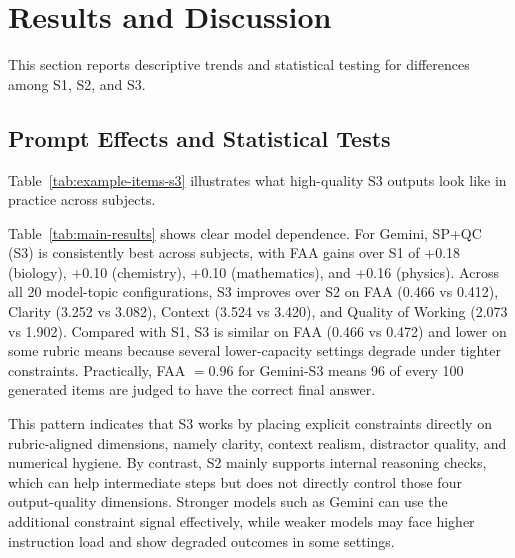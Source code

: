 ﻿\documentclass[a4paper,conference,10pt]{IEEEtran}
\begin{document}
\section{Results and Discussion}

This section reports descriptive trends and statistical testing for differences among S1, S2, and S3.

\subsection{Prompt Effects and Statistical Tests}

Table~\ref{tab:example-items-s3} illustrates what high-quality S3 outputs look like in practice across subjects.

Table~\ref{tab:main-results} shows clear model dependence. For Gemini, SP+QC (S3) is consistently best across subjects, with FAA gains over S1 of +0.18 (biology), +0.10 (chemistry), +0.10 (mathematics), and +0.16 (physics). Across all 20 model-topic configurations, S3 improves over S2 on FAA (0.466 vs 0.412), Clarity (3.252 vs 3.082), Context (3.524 vs 3.420), and Quality of Working (2.073 vs 1.902). Compared with S1, S3 is similar on FAA (0.466 vs 0.472) and lower on some rubric means because several lower-capacity settings degrade under tighter constraints. Practically, FAA \(=0.96\) for Gemini-S3 means 96 of every 100 generated items are judged to have the correct final answer.

This pattern indicates that S3 works by placing explicit constraints directly on rubric-aligned dimensions, namely clarity, context realism, distractor quality, and numerical hygiene. By contrast, S2 mainly supports internal reasoning checks, which can help intermediate steps but does not directly control those four output-quality dimensions. Stronger models such as Gemini can use the additional constraint signal effectively, while weaker models may face higher instruction load and show degraded outcomes in some settings.
\end{document}
